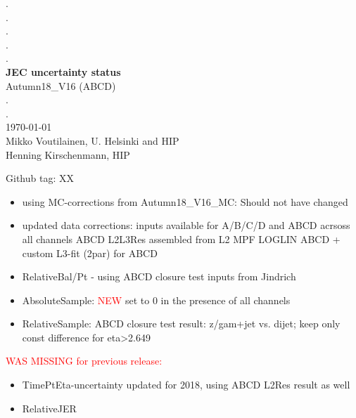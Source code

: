 \documentclass[landscape,10pt]{beamer} %
\begin{document}
\begin{centering}
{. }\\
{. }\\
{. }\\
{. }\\
{. }\\
{\bf JEC uncertainty status}\\
Autumn18\_V16 (ABCD)\\
.\\
.\\
\today\\
Mikko Voutilainen, U. Helsinki and HIP\\
Henning Kirschenmann, HIP\\
\end{centering}

\newpage

Github tag: XX

\begin{itemize}
\item using  MC-corrections from Autumn18\_V16\_MC: Should not have changed
\item updated data corrections: inputs available for A/B/C/D and ABCD acrsoss all channels ABCD L2L3Res assembled from L2 MPF LOGLIN ABCD + custom L3-fit (2par) for ABCD
\item RelativeBal/Pt -  using ABCD closure test inputs from Jindrich
\item AbsoluteSample: \textcolor{red}{NEW} set to 0 in the presence of all channels
\item RelativeSample: ABCD closure test result: z/gam+jet vs. dijet; keep only const difference for eta>2.649
\end{itemize}
\textcolor{red}{WAS MISSING for previous release:}
\begin{itemize}
\item TimePtEta-uncertainty updated for 2018, using ABCD L2Res result as well
\item RelativeJER
\end{itemize}
\end{document}
